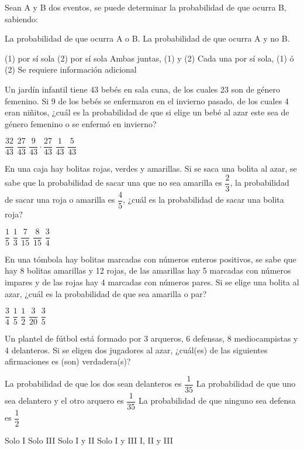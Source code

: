 \documentclass[sin nombre]{srs2}
\begin{document}
\begin{preguntas}
\pregunta Sean A y B dos eventos, se puede determinar la probabilidad de que ocurra B, sabiendo:
\begin{opciones*}
\opcion La probabilidad de que ocurra A o B.
\opcion La probabilidad de que ocurra A y no B.
\end{opciones*}
\begin{alternativas}
\alternativa (1) por sí sola
\alternativa (2) por sí sola
\alternativa Ambas juntas, (1) y (2)
\alternativa Cada una por sí sola, (1) ó (2)
\alternativa Se requiere información adicional
\end{alternativas}


\pregunta Un jardín infantil tiene 43 bebés en sala cuna, de los cuales 23 son de género femenino. Si 9 de los bebés se enfermaron en el invierno pasado, de los cuales 4 eran niñitos, ¿cuál es la probabilidad de que si elige un bebé al azar este sea de género femenino o se enfermó en invierno?
\begin{alternativas}
\alternativa $\dfrac{32}{43}$
\alternativa $\dfrac{27}{43}$
\alternativa $\dfrac{9}{43} \cdot \dfrac{27}{43}$
\alternativa $\dfrac{1}{43}$
\alternativa $\dfrac{5}{43}$
\end{alternativas}

\pregunta En una caja hay bolitas rojas, verdes y amarillas. Si se saca una bolita al azar, se sabe que la probabilidad de sacar una que no sea amarilla es $\dfrac{2}{3}$, la probabilidad de sacar una roja o amarilla es $\dfrac{4}{5}$, ¿cuál es la probabilidad de sacar una bolita roja?
\begin{alternativas}
\alternativa $\dfrac{1}{5}$
\alternativa $\dfrac{1}{3}$
\alternativa $\dfrac{7}{15}$
\alternativa $\dfrac{8}{15}$
\alternativa $\dfrac{3}{4}$
\end{alternativas}

\pregunta En una tómbola hay bolitas marcadas con números enteros positivos, se sabe que hay 8 bolitas amarillas y 12 rojas, de las amarillas hay 5 marcadas con números impares y de las rojas hay 4 marcadas con números pares. Si se elige una bolita al azar, ¿cuál es la probabilidad de que sea amarilla o par?
\begin{alternativas}
\alternativa $\dfrac{3}{4}$
\alternativa $\dfrac{1}{5}$
\alternativa $\dfrac{1}{2}$
\alternativa $\dfrac{3}{20}$
\alternativa $\dfrac{3}{5}$
\end{alternativas}

\pregunta Un plantel de fútbol está formado por 3 arqueros, 6 defensas, 8 mediocampistas y 4 delanteros. Si se eligen dos jugadores al azar, ¿cuál(es) de las siguientes afirmaciones es (son) verdadera(s)?
\begin{opciones}
\opcion La probabilidad de que los dos sean delanteros es $\dfrac{1}{35}$
\opcion La probabilidad de que uno sea delantero y el otro arquero es $\dfrac{1}{35}$
\opcion La probabilidad de que ninguno sea defensa es $\dfrac{1}{2}$
\end{opciones}
\begin{alternativas}
\alternativa Solo I
\alternativa Solo III
\alternativa Solo I y II
\alternativa Solo I y III
\alternativa I, II y III
\end{alternativas}


\end{preguntas}
\end{document}
